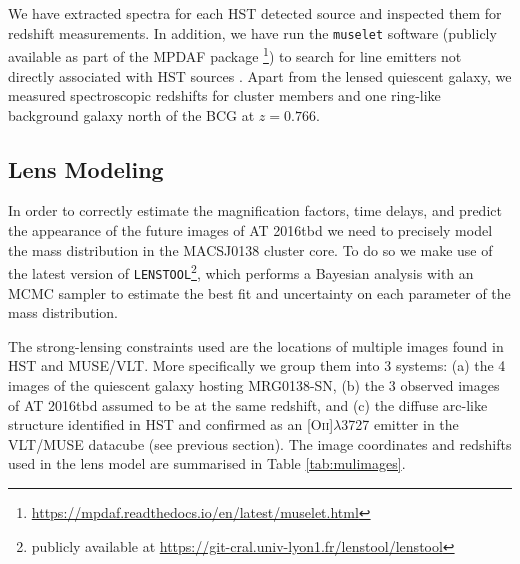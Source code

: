 \documentclass[12pt]{article}
\def\SNABC{AT 2016tbd\xspace}
\def\lenstool{{\tt LENSTOOL}\xspace}
\begin{document}
We have extracted spectra for each HST detected source and inspected them for redshift measurements. In addition, we have run the {\tt muselet} software (publicly available as part of the MPDAF package \cite{piqueras_mpdaf_2019}\footnote{\url{https://mpdaf.readthedocs.io/en/latest/muselet.html}}) to search for line emitters not directly associated with HST sources \cite{mahler_strong_2018,lagattuta_probing_2019}. Apart from the lensed quiescent galaxy, we measured spectroscopic redshifts for cluster members and one ring-like background galaxy north of the BCG at $z=0.766$.  

\subsection*{Lens Modeling}

In order to correctly estimate the magnification factors, time delays, and predict the appearance of the future images of \SNABC we need to precisely model the mass distribution in the MACSJ0138 cluster core. To do so we make use of the latest version of \lenstool \cite{jullo_bayesian_2007}\footnote{publicly available at \url{ https://git-cral.univ-lyon1.fr/lenstool/lenstool}}, which performs a Bayesian analysis with an MCMC sampler to estimate the best fit and uncertainty on each parameter of the mass distribution. 

The strong-lensing constraints used are the locations of multiple images found in HST and MUSE/VLT. More specifically we group them into 3 systems: (a) the 4 images of the quiescent galaxy hosting MRG0138-SN, (b) the 3 observed images of \SNABC assumed to be at the same redshift, and (c) the diffuse arc-like structure identified in HST and confirmed as an [O\textsc{ii}]$\lambda$3727 emitter in the VLT/MUSE datacube (see previous section). The image coordinates and redshifts used in the lens model are summarised in Table \ref{tab:mulimages}.
\end{document}
